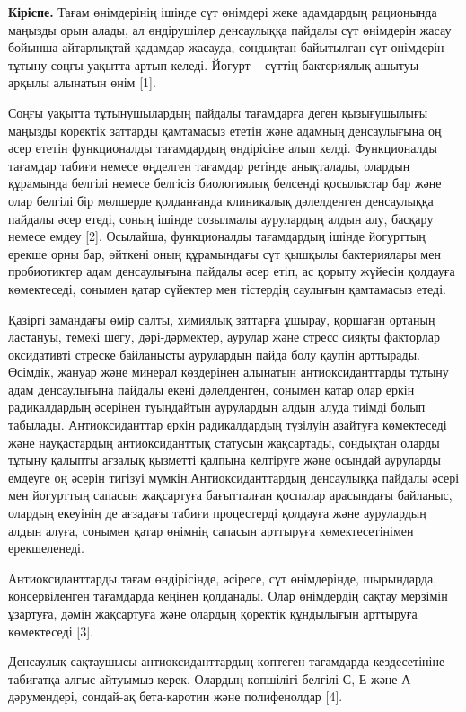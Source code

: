 \begin{multicols}{2}
{\bfseries Кіріспе.} Тағам өнімдерінің ішінде сүт өнімдері жеке адамдардың
рационында маңызды орын алады, ал өндірушілер денсаулыққа пайдалы сүт
өнімдерін жасау бойынша айтарлықтай қадамдар жасауда, сондықтан
байытылған сүт өнімдерін тұтыну соңғы уақытта артып келеді. Йогурт --
сүттің бактериялық ашытуы арқылы алынатын өнім {[}1{]}.

Соңғы уақытта тұтынушылардың пайдалы тағамдарға деген қызығушылығы
маңызды қоректік заттарды қамтамасыз ететін және адамның денсаулығына оң
әсер ететін функционалды тағамдардың өндірісіне алып келді. Функционалды
тағамдар табиғи немесе өңделген тағамдар ретінде анықталады, олардың
құрамында белгілі немесе белгісіз биологиялық белсенді қосылыстар бар
және олар белгілі бір мөлшерде қолданғанда клиникалық дәлелденген
денсаулыққа пайдалы әсер етеді, соның ішінде созылмалы аурулардың алдын
алу, басқару немесе емдеу {[}2{]}. Осылайша, функционалды тағамдардың
ішінде йогурттың ерекше орны бар, өйткені оның құрамындағы сүт қышқылы
бактериялары мен пробиотиктер адам денсаулығына пайдалы әсер етіп, ас
қорыту жүйесін қолдауға көмектеседі, сонымен қатар сүйектер мен
тістердің саулығын қамтамасыз етеді.

Қазіргі замандағы өмір салты, химиялық заттарға ұшырау, қоршаған ортаның
ластануы, темекі шегу, дәрі-дәрмектер, аурулар және стресс сияқты
факторлар оксидативті стреске байланысты аурулардың пайда болу қаупін
арттырады. Өсімдік, жануар және минерал көздерінен алынатын
антиоксиданттарды тұтыну адам денсаулығына пайдалы екені дәлелденген,
сонымен қатар олар еркін радикалдардың әсерінен туындайтын аурулардың
алдын алуда тиімді болып табылады. Антиоксиданттар еркін радикалдардың
түзілуін азайтуға көмектеседі және науқастардың антиоксиданттық статусын
жақсартады, сондықтан оларды тұтыну қалыпты ағзалық қызметті қалпына
келтіруге және осындай ауруларды емдеуге оң әсерін тигізуі
мүмкін.Антиоксиданттардың денсаулыққа пайдалы әсері мен йогурттың
сапасын жақсартуға бағытталған қоспалар арасындағы байланыс, олардың
екеуінің де ағзадағы табиғи процестерді қолдауға және аурулардың алдын
алуға, сонымен қатар өнімнің сапасын арттыруға көмектесетінімен
ерекшеленеді.

Антиоксиданттарды тағам өндірісінде, әсіресе, сүт өнімдерінде,
шырындарда, консервіленген тағамдарда кеңінен қолданады. Олар өнімдердің
сақтау мерзімін ұзартуға, дәмін жақсартуға және олардың қоректік
құндылығын арттыруға көмектеседі {[}3{]}.

Денсаулық сақтаушысы антиоксиданттардың көптеген тағамдарда
кездесетініне табиғатқа алғыс айтуымыз керек. Олардың көпшілігі белгілі
С, Е және А дәрумендері, сондай-ақ бета-каротин және полифенолдар
{[}4{]}.


\end{multicols}
